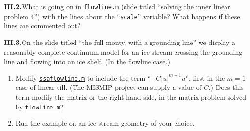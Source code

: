 \documentclass[11pt,final]{amsart}
\newcommand{\exer}[2]{\medskip\noindent \textbf{#1.}\quad #2}
\newcommand{\mname}[1]{\href{http://www.dms.uaf.edu/~bueler/karthaus/mfiles/#1}{\texttt{#1}}}
\begin{document}
\exer{III.2}{What is going on in \mname{flowline.m} (slide titled ``solving the inner linear problem 4'') with the lines about the ``\texttt{scale}'' variable?  What happens if these lines are commented out?}

\exer{III.3}{On the slide titled ``the full monty, with a grounding line'' we display a reasonably complete continuum model for an ice stream crossing the grounding line and flowing into an ice shelf.  (In the flowline case.) \renewcommand{\labelenumi}{(\alph{enumi})}
\begin{enumerate}
\item Modify \mname{ssaflowline.m} to include the term ``$- C|u|^{m-1}u$'', first in the $m=1$ case of linear till.  (The MISMIP project can supply a value of $C$.)  Does this term modify the matrix or the right hand side, in the matrix problem solved by \mname{flowline.m}?
\item Run the example on an ice stream geometry of your choice.
\end{enumerate}}



\end{document}
